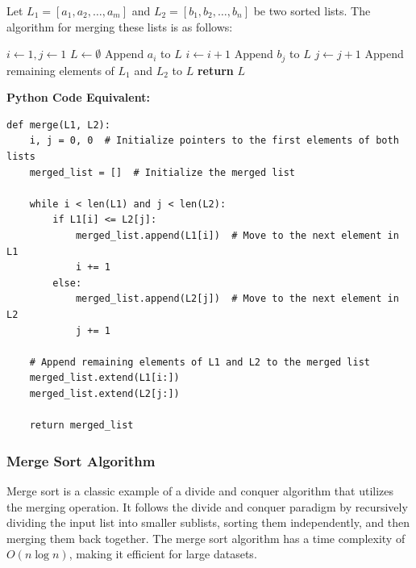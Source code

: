\documentclass[12pt]{book} %
\begin{document}
Let \( L_1 = [a_1, a_2, \ldots, a_m] \) and \( L_2 = [b_1, b_2, \ldots, b_n] \) be two sorted lists. The algorithm for merging these lists is as follows:

\begin{algorithm}[H]
\caption{Merge Two Sorted Lists}
\begin{algorithmic}[1]
    \State \( i \gets 1, j \gets 1 \) 
    \State \( L \gets \emptyset \) 
            \State Append \( a_i \) to \( L \) 
            \State \( i \gets i + 1 \)
        \Else
            \State Append \( b_j \) to \( L \) 
            \State \( j \gets j + 1 \)
        \EndIf
    \EndWhile
    \State Append remaining elements of \( L_1 \) and \( L_2 \) to \( L \) 
    \State \textbf{return} \( L \)
\EndProcedure
\end{algorithmic}
\end{algorithm}
\FloatBarrier
\textbf{Python Code Equivalent:}
\FloatBarrier
\begin{lstlisting}
def merge(L1, L2):
    i, j = 0, 0  # Initialize pointers to the first elements of both lists
    merged_list = []  # Initialize the merged list

    while i < len(L1) and j < len(L2):
        if L1[i] <= L2[j]:
            merged_list.append(L1[i])  # Move to the next element in L1
            i += 1
        else:
            merged_list.append(L2[j])  # Move to the next element in L2
            j += 1

    # Append remaining elements of L1 and L2 to the merged list
    merged_list.extend(L1[i:])
    merged_list.extend(L2[j:])
    
    return merged_list

\end{lstlisting}

\subsubsection{Merge Sort Algorithm}

Merge sort is a classic example of a divide and conquer algorithm that utilizes the merging operation. It follows the divide and conquer paradigm by recursively dividing the input list into smaller sublists, sorting them independently, and then merging them back together. The merge sort algorithm has a time complexity of \( O(n \log n) \), making it efficient for large datasets.
\end{document}
